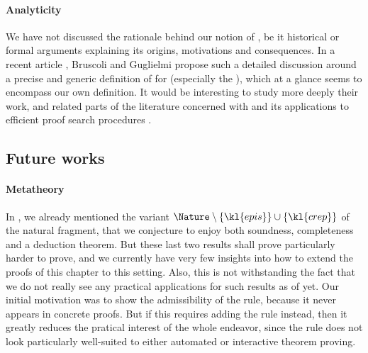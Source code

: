 \begin{scope}
\paragraph{Analyticity}

We have not discussed the rationale behind our notion of , be it
historical or formal arguments explaining its origins, motivations and
consequences. In a recent article , Bruscoli
and Guglielmi propose such a detailed discussion around a precise and generic
definition of  for   (especially
the ), which at a glance seems to encompass our own
definition. It would be interesting to study more deeply their work, and related
parts of the  literature concerned with  and its
applications to efficient proof search procedures
.

\subsection{Future works}

\paragraph{Metatheory}

In , we already mentioned the variant $\Nature \setminus
\{\kl{epis}\} \cup \{\kl{crep}\}$ of the natural fragment, that we conjecture
to enjoy both soundness, completeness and a deduction theorem. But these last
two results shall prove particularly harder to prove, and we currently have very
few insights into how to extend the proofs of this chapter to this setting.
Also, this is not withstanding the fact that we do not really see any practical
applications for such results as of yet. Our initial motivation was to show the
admissibility of the  rule, because it never appears in concrete
proofs. But if this requires adding the  rule instead, then it greatly
reduces the pratical interest of the whole endeavor, since the  rule
does not look particularly well-suited to either automated or interactive
theorem proving.


\end{scope}
